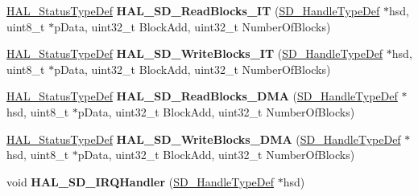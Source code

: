 \begin{DoxyCompactItemize}
\mbox{\hyperlink{stm32f7xx__hal__def_8h_a63c0679d1cb8b8c684fbb0632743478f}{H\+A\+L\+\_\+\+Status\+Type\+Def}} {\bfseries H\+A\+L\+\_\+\+S\+D\+\_\+\+Read\+Blocks\+\_\+\+IT} (\mbox{\hyperlink{group___s_d___exported___types___group3_ga1f31eb64a86b0c740bb5c02fa4c9914d}{S\+D\+\_\+\+Handle\+Type\+Def}} $\ast$hsd, uint8\+\_\+t $\ast$p\+Data, uint32\+\_\+t Block\+Add, uint32\+\_\+t Number\+Of\+Blocks)
\item 
\mbox{\label{group___s_d___exported___functions___group2_gaeb46f1a16f34cec88b7bd5f429e6c48e}} 
\mbox{\hyperlink{stm32f7xx__hal__def_8h_a63c0679d1cb8b8c684fbb0632743478f}{H\+A\+L\+\_\+\+Status\+Type\+Def}} {\bfseries H\+A\+L\+\_\+\+S\+D\+\_\+\+Write\+Blocks\+\_\+\+IT} (\mbox{\hyperlink{group___s_d___exported___types___group3_ga1f31eb64a86b0c740bb5c02fa4c9914d}{S\+D\+\_\+\+Handle\+Type\+Def}} $\ast$hsd, uint8\+\_\+t $\ast$p\+Data, uint32\+\_\+t Block\+Add, uint32\+\_\+t Number\+Of\+Blocks)
\item 
\mbox{\label{group___s_d___exported___functions___group2_ga28918afbbec3039c3cef5ca52c923eb9}} 
\mbox{\hyperlink{stm32f7xx__hal__def_8h_a63c0679d1cb8b8c684fbb0632743478f}{H\+A\+L\+\_\+\+Status\+Type\+Def}} {\bfseries H\+A\+L\+\_\+\+S\+D\+\_\+\+Read\+Blocks\+\_\+\+D\+MA} (\mbox{\hyperlink{group___s_d___exported___types___group3_ga1f31eb64a86b0c740bb5c02fa4c9914d}{S\+D\+\_\+\+Handle\+Type\+Def}} $\ast$hsd, uint8\+\_\+t $\ast$p\+Data, uint32\+\_\+t Block\+Add, uint32\+\_\+t Number\+Of\+Blocks)
\item 
\mbox{\label{group___s_d___exported___functions___group2_gaf36737ac0370bcd8872f7c367e675b42}} 
\mbox{\hyperlink{stm32f7xx__hal__def_8h_a63c0679d1cb8b8c684fbb0632743478f}{H\+A\+L\+\_\+\+Status\+Type\+Def}} {\bfseries H\+A\+L\+\_\+\+S\+D\+\_\+\+Write\+Blocks\+\_\+\+D\+MA} (\mbox{\hyperlink{group___s_d___exported___types___group3_ga1f31eb64a86b0c740bb5c02fa4c9914d}{S\+D\+\_\+\+Handle\+Type\+Def}} $\ast$hsd, uint8\+\_\+t $\ast$p\+Data, uint32\+\_\+t Block\+Add, uint32\+\_\+t Number\+Of\+Blocks)
\item 
\mbox{\label{group___s_d___exported___functions___group2_ga78f4def85126ae50eba783a6b237ec0f}} 
void {\bfseries H\+A\+L\+\_\+\+S\+D\+\_\+\+I\+R\+Q\+Handler} (\mbox{\hyperlink{group___s_d___exported___types___group3_ga1f31eb64a86b0c740bb5c02fa4c9914d}{S\+D\+\_\+\+Handle\+Type\+Def}} $\ast$hsd)

\end{DoxyCompactItemize}

